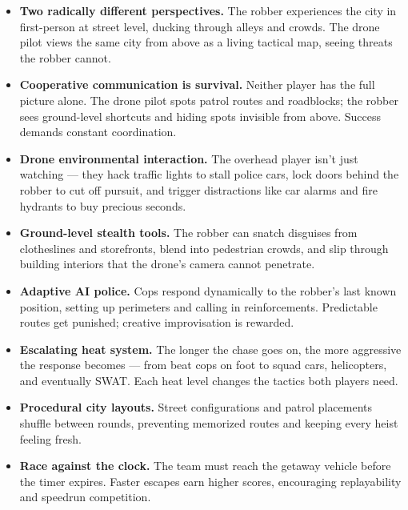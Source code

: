 \documentclass[12pt]{article}
\begin{document}
\begin{itemize}[leftmargin=2em]
    \item \textbf{Two radically different perspectives.} The robber experiences the city in first-person at street level, ducking through alleys and crowds. The drone pilot views the same city from above as a living tactical map, seeing threats the robber cannot.

    \item \textbf{Cooperative communication is survival.} Neither player has the full picture alone. The drone pilot spots patrol routes and roadblocks; the robber sees ground-level shortcuts and hiding spots invisible from above. Success demands constant coordination.

    \item \textbf{Drone environmental interaction.} The overhead player isn't just watching --- they hack traffic lights to stall police cars, lock doors behind the robber to cut off pursuit, and trigger distractions like car alarms and fire hydrants to buy precious seconds.

    \item \textbf{Ground-level stealth tools.} The robber can snatch disguises from clotheslines and storefronts, blend into pedestrian crowds, and slip through building interiors that the drone's camera cannot penetrate.

    \item \textbf{Adaptive AI police.} Cops respond dynamically to the robber's last known position, setting up perimeters and calling in reinforcements. Predictable routes get punished; creative improvisation is rewarded.

    \item \textbf{Escalating heat system.} The longer the chase goes on, the more aggressive the response becomes --- from beat cops on foot to squad cars, helicopters, and eventually SWAT. Each heat level changes the tactics both players need.

    \item \textbf{Procedural city layouts.} Street configurations and patrol placements shuffle between rounds, preventing memorized routes and keeping every heist feeling fresh.

    \item \textbf{Race against the clock.} The team must reach the getaway vehicle before the timer expires. Faster escapes earn higher scores, encouraging replayability and speedrun competition.
\end{itemize}
\end{document}
